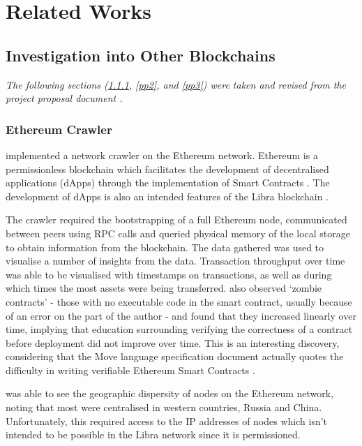 \documentclass[12pt,openany,a4paper]{book}
\begin{document}
\chapter{Related Works}
\label{__related_works}
\section{Investigation into Other Blockchains}
\textit{The following sections (\ref{pp1}, \ref{pp2}, and \ref{pp3}) were taken 
and revised from the project proposal document \cite{project_proposal}.}
\label{__related_works:other_blockchains}
\subsection{Ethereum Crawler}
\label{pp1}
\cite{eth_crawler} implemented a network crawler on the Ethereum network. 
Ethereum is a permissionless blockchain which facilitates the development 
of decentralised applications (dApps) through the implementation of Smart 
Contracts \cite{vitalik}. The development of dApps is also an intended features of the 
Libra blockchain \cite{libra_path_forward}.

The crawler required the bootstrapping of a full Ethereum node, communicated 
between peers using RPC calls and queried physical memory of the local storage to 
obtain information from the blockchain. The data gathered was used to 
visualise a number of insights from the data. Transaction throughput over time 
was able to be visualised with timestamps on transactions, as well as during 
which times the most assets were being transferred. \cite{eth_crawler} also 
observed ‘zombie contracts’ - those with no executable code in the smart 
contract, usually because of an error on the part of the author - and found 
that they increased linearly over time, implying that education surrounding 
verifying the correctness of a contract before deployment did not improve over 
time. This is an interesting discovery, considering that the Move language 
specification document actually quotes the difficulty in writing verifiable 
Ethereum Smart Contracts \cite{libra_move}.

\cite{eth_crawler} was able to see the geographic dispersity of nodes on the 
Ethereum network, noting that most were centralised in western countries, 
Russia and China. Unfortunately, this required access to the IP addresses of 
nodes which isn’t intended to be possible in the Libra network since it is 
permissioned.
\end{document}
